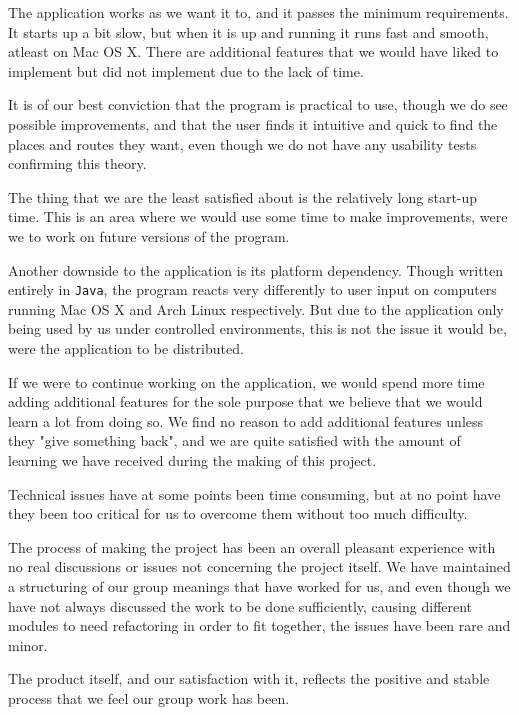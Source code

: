 The application works as we want it to, and it passes the minimum requirements. It starts up a bit slow, but when it is up and running it runs fast and smooth, atleast on Mac OS X. There are additional features that we would have liked to implement but did not implement due to the lack of time.

It is of our best conviction that the program is practical to use, though we do see possible improvements, and that the user finds it intuitive and quick to find the places and routes they want, even though we do not have any usability tests confirming this theory.

The thing that we are the least satisfied about is the relatively long start-up time. This is an area where we would use some time to make improvements, were we to work on future versions of the program.

Another downside to the application is its platform dependency. Though written entirely in \texttt{Java}, the program reacts very differently to user input on computers running Mac OS X and Arch Linux respectively. But due to the application only being used by us under controlled environments, this is not the issue it would be, were the application to be distributed.

If we were to continue working on the application, we would spend more time adding additional features for the sole purpose that we believe that we would learn a lot from doing so. We find no reason to add additional features unless they "give something back", and we are quite satisfied with the amount of learning we have received during the making of this project.

Technical issues have at some points been time consuming, but at no point have they been too critical for us to overcome them without too much difficulty.

The process of making the project has been an overall pleasant experience with no real discussions or issues not concerning the project itself. We have maintained a structuring of our group meanings that have worked for us, and even though we have not always discussed the work to be done sufficiently, causing different modules to need refactoring in order to fit together, the issues have been rare and minor.

The product itself, and our satisfaction with it, reflects the positive and stable process that we feel our group work has been.
